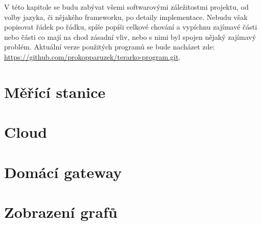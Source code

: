 V této kapitole se budu zabývat všemi softwarovými záležitostmi projektu, od volby jazyka, či nějakého frameworku, po 
detaily implementace. Nebudu však popisovat řádek po řádku, spíše popíši celkové chování a vypíchnu zajímavé části nebo 
části co mají na chod zásadní vliv, nebo s nimi byl spojen nějaký zajímavý problém. Aktuální verze použitých programů se 
bude nacházet zde: \url{https://github.com/prokopparuzek/terarko-program.git}.
\section{Měřící stanice}

\section{Cloud}

\section{Domácí gateway}

\section{Zobrazení grafů}

